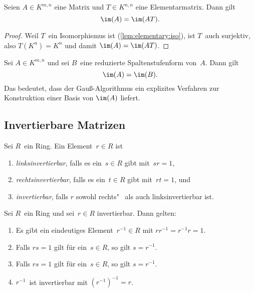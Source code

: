 \documentclass[a4paper]{article}
\begin{document}
\begin{lemma}
    Seien $A \in K^{m,n}$ eine Matrix und $T \in K^{n,n}$ eine Elementarmatrix. Dann gilt
    \begin{equation*}
        \im(A) = \im(AT).
    \end{equation*}
\end{lemma}

\begin{proof}
    Weil $T$~ein Isomorphismus ist (\cref{lem:elementary:iso}), ist $T$~auch surjektiv, also $T(K^n) = K^n$ und damit $\im(A) = \im(AT)$.
\end{proof}

\begin{corollary}
    Sei $A \in K^{m,n}$ und sei $B$~eine reduzierte Spaltenstufenform von~$A$. Dann gilt
    \begin{equation*}
        \im(A) = \im(B).
    \end{equation*}
    Das bedeutet, dass der Gauß-Algorithmus ein explizites Verfahren zur Konstruktion einer Basis von $\im(A)$ liefert.
\end{corollary}


\subsection{Invertierbare Matrizen}

\begin{definition}[invertierbar]
    Sei $R$~ein Ring. Ein Element~$r \in R$ ist
    \begin{enumerate}
        \item \emph{linksinvertierbar}, falls es ein~$s \in R$ gibt mit~$sr = 1$,
        \item \emph{rechtsinvertierbar}, falls es ein~$t \in R$ gibt mit~$rt = 1$, und
        \item \emph{invertierbar}, falls $r$ sowohl rechts"~ als auch linksinvertierbar ist.
    \end{enumerate}
\end{definition}

\begin{lemma}
    Sei $R$~ein Ring und sei~$r \in R$ invertierbar. Dann gelten:
    \begin{enumerate}
        \item Es gibt ein eindeutiges Element~$r^{-1} \in R$ mit $rr^{-1} = r^{-1}r = 1$.\label{lem:ring:inverse:1}
        \item Falls $rs = 1$ gilt für ein~$s \in R$, so gilt $s = r^{-1}$.
        \item Falls $rs = 1$ gilt für ein~$s \in R$, so gilt $s = r^{-1}$.
        \item $r^{-1}$~ist invertierbar mit $(r^{-1})^{-1} = r$.
    \end{enumerate}
\end{lemma}
\end{document}
